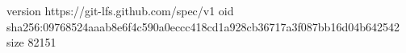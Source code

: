version https://git-lfs.github.com/spec/v1
oid sha256:09768524aaab8e6f4c590a0eccc418cd1a928cb36717a3f087bb16d04b642542
size 82151
